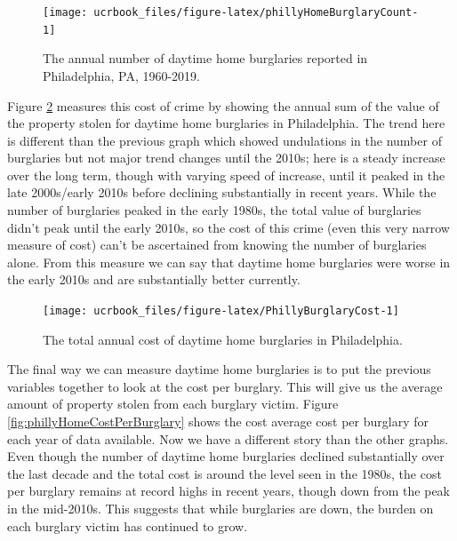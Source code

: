 \documentclass[
  12pt,
  openany]{book}
\begin{document}
\begin{figure}

{\centering \texttt{[image: ucrbook\_files/figure-latex/phillyHomeBurglaryCount-1]} 

}

\caption{The annual number of daytime home burglaries reported in Philadelphia, PA, 1960-2019.}\label{fig:phillyHomeBurglaryCount}
\end{figure}

Figure \ref{fig:PhillyBurglaryCost} measures this cost of crime by showing the annual sum of the value of the property stolen for daytime home burglaries in Philadelphia. The trend here is different than the previous graph which showed undulations in the number of burglaries but not major trend changes until the 2010s; here is a steady increase over the long term, though with varying speed of increase, until it peaked in the late 2000s/early 2010s before declining substantially in recent years. While the number of burglaries peaked in the early 1980s, the total value of burglaries didn't peak until the early 2010s, so the cost of this crime (even this very narrow measure of cost) can't be ascertained from knowing the number of burglaries alone. From this measure we can say that daytime home burglaries were worse in the early 2010s and are substantially better currently.

\begin{figure}

{\centering \texttt{[image: ucrbook\_files/figure-latex/PhillyBurglaryCost-1]} 

}

\caption{The total annual cost of daytime home burglaries in Philadelphia.}\label{fig:PhillyBurglaryCost}
\end{figure}

The final way we can measure daytime home burglaries is to put the previous variables together to look at the cost per burglary. This will give us the average amount of property stolen from each burglary victim. Figure \ref{fig:phillyHomeCostPerBurglary} shows the cost average cost per burglary for each year of data available. Now we have a different story than the other graphs. Even though the number of daytime home burglaries declined substantially over the last decade and the total cost is around the level seen in the 1980s, the cost per burglary remains at record highs in recent years, though down from the peak in the mid-2010s. This suggests that while burglaries are down, the burden on each burglary victim has continued to grow.
\end{document}
